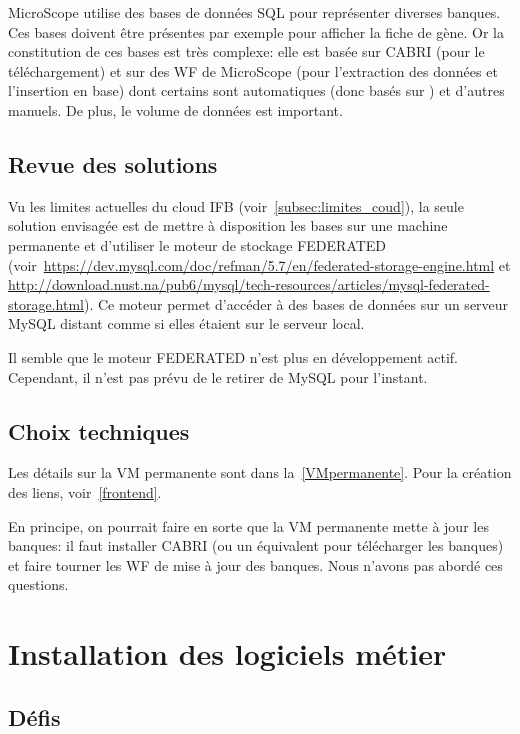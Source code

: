 MicroScope utilise des bases de données SQL pour représenter diverses banques.
Ces bases doivent être présentes par exemple pour afficher la fiche de gène.
Or la constitution de ces bases est très complexe:
elle est basée sur CABRI (pour le téléchargement)
et sur des WF de MicroScope (pour l'extraction des données et l'insertion en base)
dont certains sont automatiques (donc basés sur ) et d'autres manuels.
De plus, le volume de données est important.

\subsection{Revue des solutions}

Vu les limites actuelles du cloud IFB (voir~\autoref{subsec:limites_coud}),
la seule solution envisagée est de mettre à disposition les bases sur une machine permanente et
d'utiliser le moteur de stockage FEDERATED (voir~\url{https://dev.mysql.com/doc/refman/5.7/en/federated-storage-engine.html} et \url{http://download.nust.na/pub6/mysql/tech-resources/articles/mysql-federated-storage.html}).
Ce moteur permet d'accéder à des bases de données sur un serveur MySQL distant comme si elles étaient sur le serveur local.

\begin{warningbox}
    Il semble que le moteur FEDERATED n'est plus en développement actif.
    Cependant, il n'est pas prévu de le retirer de MySQL pour l'instant.
\end{warningbox}

\subsection{Choix techniques}

Les détails sur la VM permanente sont dans la~\autoref{VMpermanente}.
Pour la création des liens, voir~\autoref{frontend}.

En principe, on pourrait faire en sorte que la VM permanente mette à jour les banques:
il faut installer CABRI (ou un équivalent pour télécharger les banques) et faire tourner les WF de mise à jour des banques.
Nous n'avons pas abordé ces questions.

\section{Installation des logiciels métier} \label{sec:installation_logiciels_metier}

\subsection{Défis}

